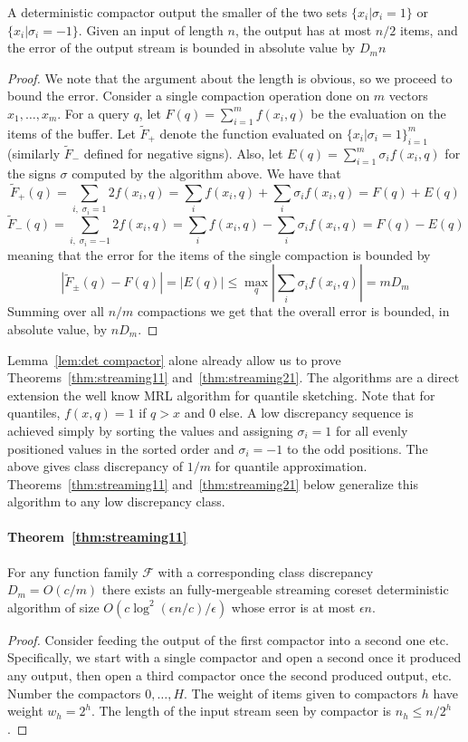 \documentclass[anon,12pt]{colt2019} %
\newcommand{\eps}{\epsilon}
\newcommand{\F}{\mathcal{F}}
\begin{document}
{\begin{lemma} \label{lem:det compactor}
A deterministic compactor output the smaller of the two sets  $\{ x_i | \sigma_i = 1\}$ or  $\{ x_i | \sigma_i = -1\}$. Given an input of length $n$, the output has at most $n/2$ items, and the error of the output stream is bounded in absolute value by $D_m n$
\end{lemma}
\begin{proof}
We note that the argument about the length is obvious, so we proceed to bound the error. Consider a single compaction operation done on $m$ vectors $x_1,\ldots,x_m$. For a query $q$, let $F(q)=\sum_{i=1}^m f(x_i,q)$ be the evaluation on the items of the buffer. Let $\tilde F_{+}$ denote the function evaluated on $\{ x_i | \sigma_i = 1\}_{i=1}^m$ (similarly $\tilde F_{-}$ defined for negative signs). Also, let $E(q) = \sum_{i=1}^m \sigma_i f(x_i,q)$ for the signs $\sigma$ computed by the algorithm above. We have that 
$$\tilde F_{+}(q) = \sum_{i ,\; \sigma_i=1} 2f(x_i, q) = \sum_{i} f(x_i, q) +  \sum_{i} \sigma_i f(x_i, q) = F(q) + E(q)$$
$$\tilde F_{-}(q) = \sum_{i ,\; \sigma_i=-1} 2f(x_i, q) = \sum_{i} f(x_i, q) - \sum_{i} \sigma_i f(x_i, q) = F(q) - E(q)$$
meaning that the error for the items of the single compaction is bounded by
$$|\tilde F_{\pm}(q) - F(q)| = |E(q)| \le \max_q |\sum_i \sigma_i f(x_i,q)| = mD_m$$
Summing over all $n/m$ compactions we get that the overall error is bounded, in absolute value, by $nD_m$.
\end{proof}

Lemma~\ref{lem:det compactor} alone already allow us to prove Theorems~\ref{thm:streaming11} and~\ref{thm:streaming21}. 
The algorithms are a direct extension the well know MRL algorithm \cite{MRL} for quantile sketching. 
Note that for quantiles, $f(x,q) = 1$ if $q > x$ and $0$ else. 
A low discrepancy sequence is achieved simply by sorting the values and assigning $\sigma_i = 1$ for all evenly positioned values in the sorted order and $\sigma_i=-1$ to the odd positions. The above gives class discrepancy of $1/m$ for quantile approximation.
Theorems~\ref{thm:streaming11} and~\ref{thm:streaming21} below generalize this algorithm to any low discrepancy class.

\paragraph{Theorem~\ref{thm:streaming11}}
For any function family $\F$ with a corresponding class discrepancy $D_m = O(c/m)$ there exists an fully-mergeable streaming coreset deterministic algorithm of size $O\left(c\log^2(\eps n/c)/\eps\right)$ whose error is at most $\eps n$.
\begin{proof}
Consider feeding the output of the first compactor into a second one etc. Specifically, we start with a single compactor and open a second once it produced any output, then open a third compactor once the second produced output, etc.
Number the compactors $0,\ldots,H$. The weight of items given to compactors $h$ have weight $w_h = 2^h$. The length of the input stream seen by compactor is $n_h \le n/2^h$.


\end{proof}}
\end{document}
